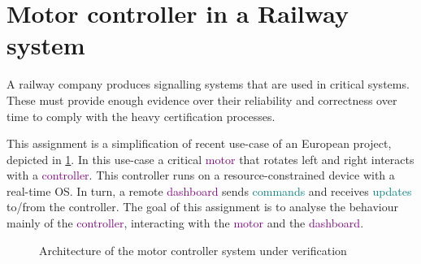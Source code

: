 \documentclass[11pt]{article}
\begin{document}
\newcommand{\compn}[1]{\textsf{\textcolor{purple}{#1}}\xspace}
\newcommand{\chn}[1]{\textsf{\textcolor{teal}{#1}}\xspace}

\section*{Motor controller in a Railway system}

A railway company produces signalling systems that are used in critical systems. These must provide enough evidence over their reliability and correctness over time to comply with the heavy certification processes.

This assignment is a simplification of recent use-case of an European project, depicted in \cref{fig:global-architecture}.
In this use-case a critical \compn{motor} that rotates left and right interacts with a \compn{controller}. This controller runs on a resource-constrained device with a real-time OS. In turn, a remote \compn{dashboard} sends \chn{commands} and receives \chn{updates} to/from the controller. The goal of this assignment is to analyse the behaviour mainly of the \compn{controller}, interacting with the \compn{motor} and the \compn{dashboard}.

\begin{figure}[tb]
  \centering
  \caption{Architecture of the motor controller system under verification}
  \label{fig:global-architecture}
\end{figure}
\end{document}
